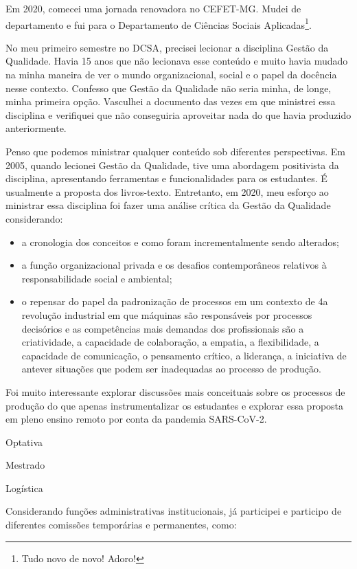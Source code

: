 \documentclass[
]{book}
\begin{document}
Em 2020, comecei uma jornada renovadora no CEFET-MG. Mudei de
departamento e fui para o Departamento de Ciências Sociais
Aplicadas\footnote{Tudo novo de novo! Adoro!}.

No meu primeiro semestre no DCSA, precisei lecionar a disciplina Gestão
da Qualidade. Havia 15 anos que não lecionava esse conteúdo e muito
havia mudado na minha maneira de ver o mundo organizacional, social e o
papel da docência nesse contexto. Confesso que Gestão da Qualidade não
seria minha, de longe, minha primeira opção. Vasculhei a documento das
vezes em que ministrei essa disciplina e verifiquei que não conseguiria
aproveitar nada do que havia produzido anteriormente.

Penso que podemos ministrar qualquer conteúdo sob diferentes
perspectivas. Em 2005, quando lecionei Gestão da Qualidade, tive uma
abordagem positivista da disciplina, apresentando ferramentas e
funcionalidades para os estudantes. É usualmente a proposta dos
livros-texto. Entretanto, em 2020, meu esforço ao ministrar essa
disciplina foi fazer uma análise crítica da Gestão da Qualidade
considerando:

\begin{itemize}
\item
  a cronologia dos conceitos e como foram incrementalmente sendo
  alterados;
\item
  a função organizacional privada e os desafios contemporâneos
  relativos à responsabilidade social e ambiental;
\item
  o repensar do papel da padronização de processos em um contexto de
  4a revolução industrial em que máquinas são responsáveis por
  processos decisórios e as competências mais demandas dos
  profissionais são a criatividade, a capacidade de colaboração, a
  empatia, a flexibilidade, a capacidade de comunicação, o pensamento
  crítico, a liderança, a iniciativa de antever situações que podem
  ser inadequadas ao processo de produção.
\end{itemize}

Foi muito interessante explorar discussões mais conceituais sobre os
processos de produção do que apenas instrumentalizar os estudantes e
explorar essa proposta em pleno ensino remoto por conta da pandemia
SARS-CoV-2.

Optativa

Mestrado

Logística

Considerando funções administrativas institucionais, já participei e
participo de diferentes comissões temporárias e permanentes, como:
\end{document}

